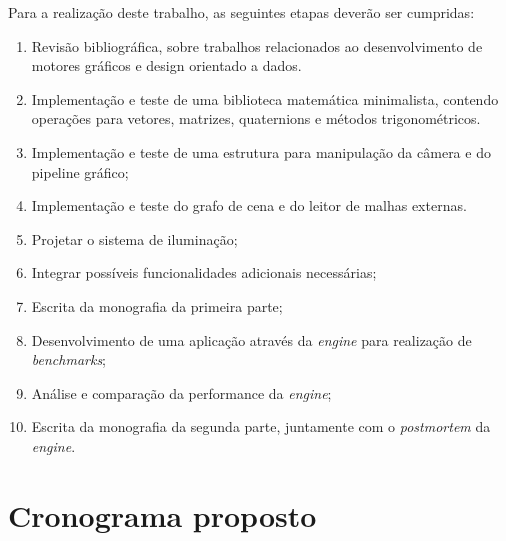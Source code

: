 \documentclass[11pt]{article}
\begin{document}
Para a realização deste trabalho, as seguintes etapas deverão ser cumpridas:

\begin{enumerate}[label=\textnormal{(\arabic*)}]
    \item Revisão bibliográfica, sobre trabalhos relacionados ao desenvolvimento de motores gráficos e design 
        orientado a dados.
    \item Implementação e teste de uma biblioteca matemática minimalista, contendo operações para vetores, 
        matrizes, quaternions e métodos trigonométricos.
    \item Implementação e teste de uma estrutura para manipulação da câmera e do pipeline gráfico;
    \item Implementação e teste do grafo de cena e do leitor de malhas externas.
    \item Projetar o sistema de iluminação;
    \item Integrar possíveis funcionalidades adicionais necessárias;
    \item Escrita da monografia da primeira parte;
    \item Desenvolvimento de uma aplicação através da \textit{engine} para realização de \textit{benchmarks};
    \item Análise e comparação da performance da \textit{engine};
    \item Escrita da monografia da segunda parte, juntamente com o \textit{postmortem} da \textit{engine}.
\end{enumerate}

\section{Cronograma proposto}
\label{cro}
\end{document}
